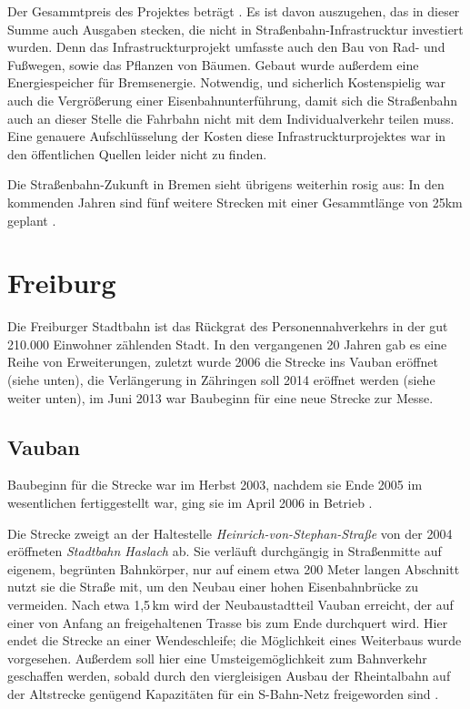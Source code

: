 Der Gesammtpreis des Projektes beträgt . Es ist davon auszugehen, das in dieser Summe auch Ausgaben stecken, die nicht in Straßenbahn-Infrastrucktur investiert wurden. Denn das Infrastruckturprojekt umfasste auch den Bau von Rad- und Fußwegen, sowie das Pflanzen von Bäumen\cite{bNp10}. Gebaut wurde außerdem eine Energiespeicher für Bremsenergie\cite{bSv12}. Notwendig, und sicherlich Kostenspielig war auch die Vergrößerung einer Eisenbahnunterführung, damit sich die Straßenbahn auch an dieser Stelle die Fahrbahn nicht mit dem Individualverkehr teilen muss. Eine genauere Aufschlüsselung der Kosten diese Infrastruckturprojektes war in den öffentlichen Quellen leider nicht zu finden. 

Die Straßenbahn-Zukunft in Bremen sieht übrigens weiterhin rosig aus:
In den kommenden Jahren sind fünf weitere Strecken mit einer Gesammtlänge von 25km geplant \cite{bNp10}.


\section{Freiburg}

Die Freiburger Stadtbahn ist das Rückgrat des Personennahverkehrs in der gut 210.000 Einwohner zählenden Stadt. In den vergangenen 20 Jahren gab es eine Reihe von Erweiterungen, zuletzt wurde 2006 die Strecke ins Vauban eröffnet (siehe unten), die Verlängerung in Zähringen soll 2014 eröffnet werden (siehe weiter unten), im Juni 2013 war Baubeginn für eine neue Strecke zur Messe.

\subsection*{Vauban}

Baubeginn für die Strecke war im Herbst 2003, nachdem sie Ende 2005 im wesentlichen fertiggestellt war, ging sie im April 2006 in Betrieb \cite{FRabv}.

Die Strecke zweigt an der Haltestelle \textit{Heinrich-von-Stephan-Straße} von der 2004 eröffneten \textit{Stadtbahn Haslach} ab.
Sie verläuft durchgängig in Straßenmitte auf eigenem, begrünten Bahnkörper, nur auf einem etwa 200 Meter langen Abschnitt nutzt sie die Straße mit, um den Neubau einer hohen Eisenbahnbrücke zu vermeiden.
Nach etwa 1,5\,km wird der Neubaustadtteil Vauban erreicht, der auf einer von Anfang an freigehaltenen Trasse bis zum Ende durchquert wird.
Hier endet die Strecke an einer Wendeschleife; die Möglichkeit eines Weiterbaus wurde vorgesehen.
Außerdem soll hier eine Umsteigemöglichkeit zum Bahnverkehr geschaffen werden, sobald durch den viergleisigen Ausbau der Rheintalbahn auf der Altstrecke genügend Kapazitäten für ein S-Bahn-Netz freigeworden sind \cite{FRabv} \cite{beob}.

